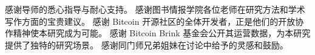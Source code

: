 \begin{acknowledgement}
感谢导师的悉心指导与耐心支持。
感谢图书情报学院各位老师在研究方法和学术写作方面的宝贵建议。
感谢 Bitcoin 开源社区的全体开发者，正是他们的开放协作精神使本研究成为可能。
感谢 Bitcoin Brink 基金会公开其运营数据，为本研究提供了独特的研究场景。
感谢同门师兄弟姐妹在讨论中给予的灵感和鼓励。
\end{acknowledgement}
